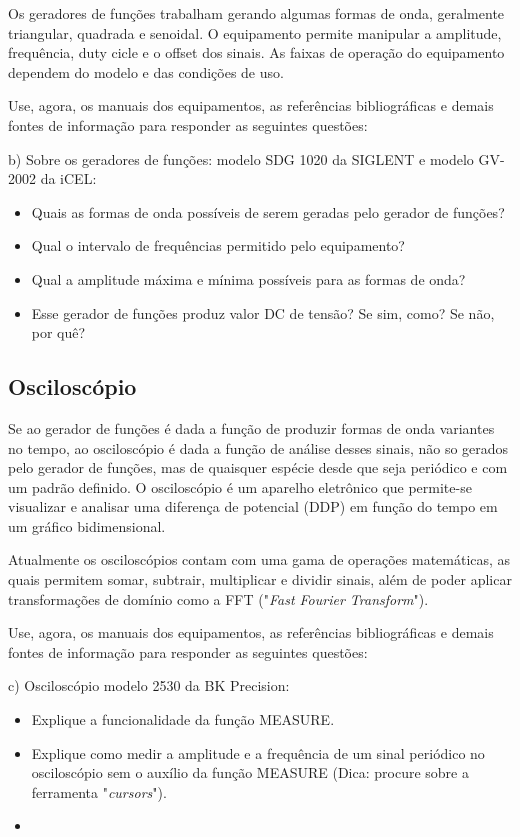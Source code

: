 Os geradores de funções trabalham gerando algumas formas de onda, geralmente triangular, quadrada e senoidal. O equipamento permite manipular a amplitude, frequência, duty cicle e o offset dos sinais. As faixas de operação do equipamento dependem do modelo e das condições de uso.

Use, agora, os manuais dos equipamentos, as referências bibliográficas e demais fontes de informação para responder as seguintes questões:

\vspace{.3cm}

b) Sobre os geradores de funções: modelo SDG 1020 da SIGLENT e modelo GV-2002 da iCEL:
\begin{itemize}
    \item Quais as formas de onda possíveis de serem geradas pelo gerador de funções?
    \item Qual o intervalo de frequências permitido pelo equipamento?
    \item Qual a amplitude máxima e mínima possíveis para as formas de onda?
    \item Esse gerador de funções produz valor DC de tensão? Se sim, como? Se não, por quê?
\end{itemize}

\subsection{Osciloscópio}

Se ao gerador de funções é dada a função de produzir formas de onda variantes no tempo, ao osciloscópio é dada a função de análise desses sinais, não so gerados pelo gerador de funções, mas de quaisquer espécie desde que seja periódico e com um padrão definido. O osciloscópio é um aparelho eletrônico que permite-se visualizar e analisar uma diferença de potencial (DDP) em função do tempo em um gráfico bidimensional.

Atualmente os osciloscópios contam com uma gama de operações matemáticas, as quais permitem somar, subtrair, multiplicar e dividir sinais, além de poder aplicar transformações de domínio como a FFT ("\textit{Fast Fourier Transform}").

Use, agora, os manuais dos equipamentos, as referências bibliográficas e demais fontes de informação para responder as seguintes questões:

\newpage

c) Osciloscópio modelo 2530 da BK Precision:
\begin{itemize}
    \item Explique a funcionalidade da função MEASURE.
    \item Explique como medir a amplitude e a frequência de um sinal periódico no osciloscópio sem o auxílio da função MEASURE (Dica: procure sobre a ferramenta "\textit{cursors}"). 
    \item 
\end{itemize}

